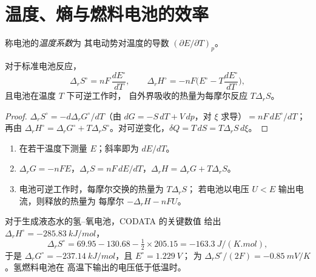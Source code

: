 \section{温度、熵与燃料电池的效率}

\begin{definition}[温度系数]\label{def:b2:cell-thermodynamics:temperature-coefficient}
称电池的\emph{温度系数}为
其电动势对温度的导数
$(\partial E/\partial T)_p$。
\end{definition}

\begin{proposition}[由电池数据求熵与焓]\label{prop:b2:cell-thermodynamics:entropy}
对于标准电池反应，
\[
  \Delta_r S^\circ = nF\,\frac{dE^\circ}{dT}, \qquad
  \Delta_r H^\circ = -nF\Big(E^\circ - T\frac{dE^\circ}{dT}\Big),
\]
且电池在温度 $T$ 下可逆工作时，
自外界吸收的热量为每摩尔反应 $T\Delta_r S$。
\end{proposition}

\begin{proof}
$\Delta_r S^\circ = -d\Delta_r G^\circ/dT$（由 $dG = -S\,dT + V\,dp$，对
$\xi$ 求导）$= nF\,dE^\circ/dT$；再由 $\Delta_r H^\circ = \Delta_r G^\circ
+ T\Delta_r S^\circ$。对可逆变化，$\delta Q = T\,dS = T\Delta_r S\,
d\xi$。
\end{proof}

\begin{method}[由电池数据求反应的热力学量]\label{met:b2:cell-thermodynamics:cell-data}
\begin{enumerate}
  \item 在若干温度下测量 $E$；斜率即为 $dE/dT$。
  \item $\Delta_r G = -nFE$，$\Delta_r S = nF\,dE/dT$，$\Delta_r H = \Delta_r G +
        T\Delta_r S$。
  \item 电池可逆工作时，每摩尔交换的热量为 $T\Delta_r S$；
        若电池以电压 $U < E$ 输出电流，则释放的热量为
        每摩尔 $-\Delta_r H - nFU$。
\end{enumerate}
\end{method}

对于生成液态水的氢–氧电池，CODATA 的关键数值
给出 $\Delta_r H^\circ = \qty{-285.83}{kJ/mol}$，
\[
  \Delta_r S^\circ = 69.95 - 130.68 - \tfrac12 \times 205.15 = \qty{-163.3}{J/(K.mol)} ,
\]
于是 $\Delta_r G^\circ = \qty{-237.14}{kJ/mol}$，且 $E^\circ = \qty{1.229}{V}$；
为 $\Delta_r S^\circ/(2F) = \qty{-0.85}{mV/K}$。氢燃料电池在
高温下输出的电压低于低温时。

